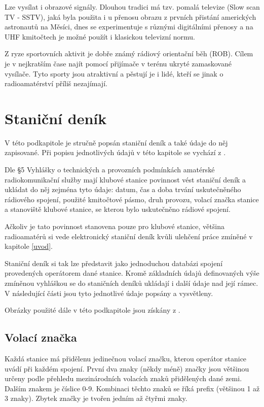 Lze vysílat i obrazové signály. Dlouhou tradici má tzv. pomalá televize (Slow
    scan TV - SSTV),
jaká byla použita i u přenosu obrazu z prvních přistání amerických astronautů na Měsíci,
dnes se experimentuje s různými digitálními přenosy a na UHF kmitočtech je možné
použít i klasickou televizní normu.

Z ryze sportovních aktivit je dobře známý rádiový
orientační běh (ROB). Cílem je v nejkratším čase najít pomocí
přijímače v terénu ukryté zamaskované vysílače. 
Tyto sporty jsou atraktivní a pěstují je i lidé, kteří se jinak o radioamatérství příliš nezajímají.

\section{Staniční deník}
\label{stanicni_denik}

V této podkapitole je stručně popsán staniční deník a také údaje do něj zapisované.
Při popisu jednotlivých údajů v této kapitole se vychází z \cite{pozadavky}.

Dle §5 Vyhlášky o technických a provozních podmínkách amatérské radiokomunikační služby \cite{vyhlaska}
mají klubové stanice povinnost vést staniční deník a ukládat do něj zejména tyto údaje: datum, čas a doba trvání
uskutečněného rádiového spojení, použité kmitočtové pásmo, druh provozu,
volací značka stanice a stanoviště klubové stanice, se kterou bylo uskutečněno rádiové spojení.

Ačkoliv je tato povinnost stanovena pouze pro klubové stanice, většina radioamatérů si vede
elektronický staniční deník kvůli ulehčení práce zmíněné v kapitole \ref{uvod}.

Staniční deník si tak lze představit jako jednoduchou databázi spojení provedených operátorem dané stanice.
Kromě základních údajů definovaných výše zmíněnou vyhláškou se do staničních deníků ukládají i další údaje
nad její rámec. V následující části jsou tyto jednotlivé údaje popsány a vysvětleny.

Obrázky použité dále v této podkapitole jsou získány z \cite{mapability}.

\subsection{Volací značka}

Každá stanice má přidělenu jedinečnou volací značku, kterou operátor stanice uvádí při každém spojení.
První dva znaky (někdy méně) značky jsou většinou určeny podle přehledu mezinárodních volacích znaků
přidělených dané zemi.
Dalším znakem je číslice 0-9. Kombinaci těchto znaků se říká prefix (většinou 1 až
3 znaky). Zbytek značky je tvořen jedním až čtyřmi znaky.

